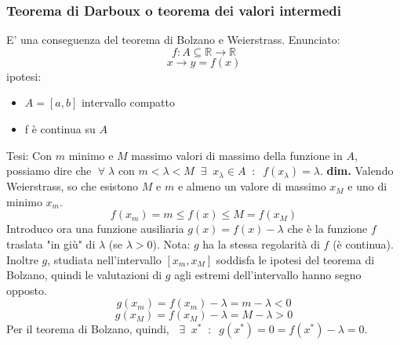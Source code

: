 \subsubsection*{Teorema di Darboux o teorema dei valori intermedi}
E' una conseguenza del teorema di Bolzano e Weierstrass.\newline
Enunciato:
\[
    f:A \subseteq \mathbb{R} \longrightarrow \mathbb{R} 
\]
\[
    x \longrightarrow y=f(x)
\]
ipotesi:
\begin{itemize}
    \item $A=[a,b]$ intervallo compatto
    \item f è continua su $A$
\end{itemize}
Tesi:\newline
Con $m$ minimo e $M$ massimo valori di massimo della funzione in $A$, possiamo dire che $\;\forall\;\lambda $ con $ m < \lambda< M \;\;\exists\;\; x_\lambda \in A \;\;:\;\; f(x_\lambda) = \lambda$.\newline
\newline
\textbf{dim.} Valendo Weierstrass, so che esistono $M$ e $m$ e almeno un valore di massimo $x_M$ e uno di minimo $x_m$.
\[
    f(x_m) = m \leq f(x) \leq M = f(x_M)
\]
Introduco ora una funzione ausiliaria $g(x) = f(x) - \lambda$ che è la funzione $f$ traslata "in giù" di $\lambda$ (se $\lambda > 0$). \newline
Nota: $g$ ha la stessa regolarità di $f$ (è continua).\newline
Inoltre $g$, studiata nell'intervallo $[x_m,x_M]$ soddisfa le ipotesi del teorema di Bolzano, quindi le valutazioni di $g$ agli estremi dell'intervallo hanno segno opposto.
\[
    g(x_m) = f(x_m) - \lambda = m-\lambda < 0
\]
\[
    g(x_M) = f(x_M) - \lambda = M-\lambda > 0
\]
Per il teorema di Bolzano, quindi, $\;\;\exists\;\; x^* \;\;:\;\; g(x^*) = 0 = f(x^*)-\lambda = 0$.\newline
\newline
\newline
